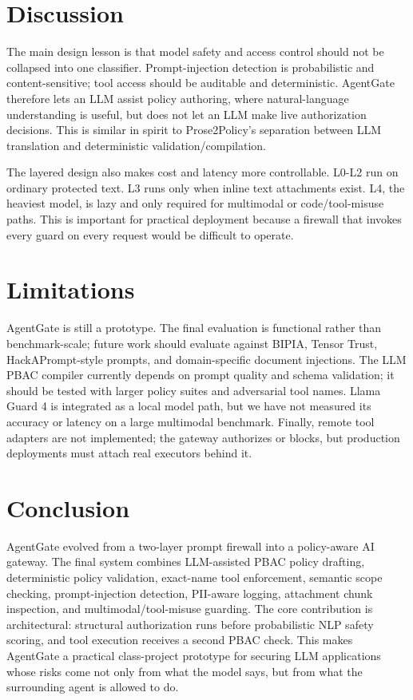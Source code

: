 \documentclass[11pt]{article}
\begin{document}
\section{Discussion}

The main design lesson is that model safety and access control should not be collapsed into one classifier. Prompt-injection detection is probabilistic and content-sensitive; tool access should be auditable and deterministic. AgentGate therefore lets an LLM assist policy authoring, where natural-language understanding is useful, but does not let an LLM make live authorization decisions. This is similar in spirit to Prose2Policy's separation between LLM translation and deterministic validation/compilation.

The layered design also makes cost and latency more controllable. L0-L2 run on ordinary protected text. L3 runs only when inline text attachments exist. L4, the heaviest model, is lazy and only required for multimodal or code/tool-misuse paths. This is important for practical deployment because a firewall that invokes every guard on every request would be difficult to operate.

\section{Limitations}

AgentGate is still a prototype. The final evaluation is functional rather than benchmark-scale; future work should evaluate against BIPIA, Tensor Trust, HackAPrompt-style prompts, and domain-specific document injections. The LLM PBAC compiler currently depends on prompt quality and schema validation; it should be tested with larger policy suites and adversarial tool names. Llama Guard 4 is integrated as a local model path, but we have not measured its accuracy or latency on a large multimodal benchmark. Finally, remote tool adapters are not implemented; the gateway authorizes or blocks, but production deployments must attach real executors behind it.

\section{Conclusion}

AgentGate evolved from a two-layer prompt firewall into a policy-aware AI gateway. The final system combines LLM-assisted PBAC policy drafting, deterministic policy validation, exact-name tool enforcement, semantic scope checking, prompt-injection detection, PII-aware logging, attachment chunk inspection, and multimodal/tool-misuse guarding. The core contribution is architectural: structural authorization runs before probabilistic NLP safety scoring, and tool execution receives a second PBAC check. This makes AgentGate a practical class-project prototype for securing LLM applications whose risks come not only from what the model says, but from what the surrounding agent is allowed to do.
\end{document}
